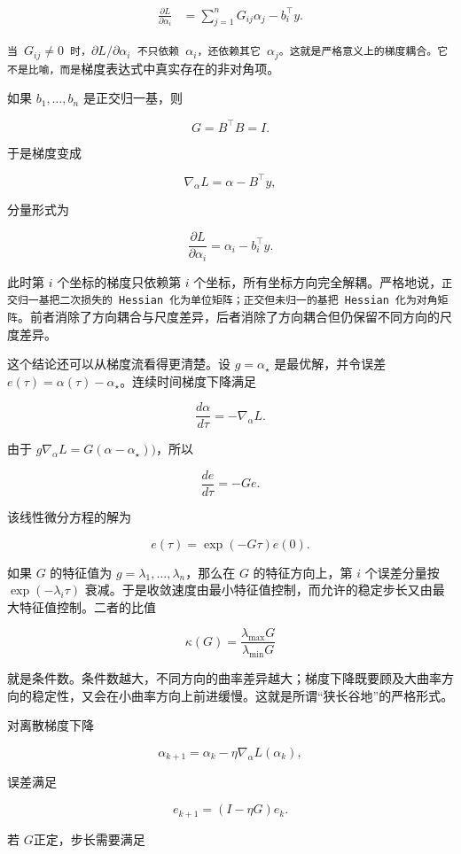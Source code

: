 \begin{align}
\frac{\partial L}{\partial \alpha_i}
&=
\sum_{j=1}^n G_{ij}\alpha_j-b_i^\top y.
\end{align}

\texttt{当 \(G_{ij}\neq 0\) 时，\(\partial L/\partial \alpha_i\) 不只依赖 \(\alpha_i\)，还依赖其它 \(\alpha_j\)。这就是严格意义上的梯度耦合。它不是比喻，而是}梯度表达式中真实存在的非对角项。

如果 \(b_1,\ldots,b_n\) 是正交归一基，则

\[
G=B^\top B=I.
\]

于是梯度变成

\[
\nabla_\alpha L=\alpha-B^\top y,
\]

分量形式为

\[
\frac{\partial L}{\partial \alpha_i}
=\alpha_i-b_i^\top y.
\]

此时第 \(i\) 个坐标的梯度只依赖第 \(i\) 个坐标，所有坐标方向完全解耦。严格地说，\verb|正交归一基把二次损失的 Hessian 化为单位矩阵；正交但未归一的基把 Hessian 化为对角矩阵|。前者消除了方向耦合与尺度差异，后者消除了方向耦合但仍保留不同方向的尺度差异。

这个结论还可以从梯度流看得更清楚。设 \(g=\alpha_\star\) 是最优解，并令误差 \(e(\tau)=\alpha(\tau)-\alpha_\star\)。连续时间梯度下降满足

\[
\frac{d\alpha}{d\tau}=-\nabla_\alpha L.
\]

由于 \(g\nabla_\alpha L=G(\alpha-\alpha_\star))\)，所以

\[
\frac{de}{d\tau}=-Ge.
\]

该线性微分方程的解为

\[
e(\tau)=\exp(-G\tau)e(0).
\]

如果 \(G\) 的特征值为 \(g=\lambda_1,\ldots,\lambda_n\)，那么在 \(G\) 的特征方向上，第 \(i\) 个误差分量按\( \exp(-\lambda_i\tau)\) 衰减。于是收敛速度由最小特征值控制，而允许的稳定步长又由最大特征值控制。二者的比值

\[
\kappa(G)=\frac{\lambda_{\max}G}{\lambda_{\min}G}
\]

就是条件数。条件数越大，不同方向的曲率差异越大；梯度下降既要顾及大曲率方向的稳定性，又会在小曲率方向上前进缓慢。这就是所谓“狭长谷地”的严格形式。

对离散梯度下降

\[
\alpha_{k+1}=\alpha_k-\eta\nabla_\alpha L(\alpha_k),
\]

误差满足

\[
e_{k+1}=(I-\eta G)e_k.
\]

若 \(G\)正定，步长需要满足

